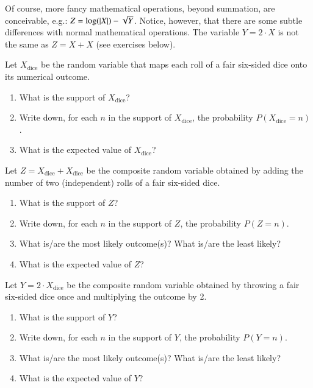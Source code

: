 \documentclass[nobib,nofonts]{tufte-handout}
\newcommand{\mult}{\ensuremath{\cdot}}
\begin{document}
Of course, more fancy mathematical operations, beyond summation, are conceivable, e.g.: $Z = \log(\lvert X \rvert) - \sqrt{Y}$.
Notice, however, that there are some subtle differences with normal mathematical operations.
The variable $Y = 2 \mult X$ is not the same as $Z = X + X$ (see exercises below).

\bigskip
\noindent \colorbox{mygray}{\centering
  \begin{minipage}{1.0\textwidth}

    \begin{exercise}
      Let $X_{\text{dice}}$ be the random variable that maps each roll of a fair six-sided dice onto its numerical outcome.
      \begin{enumerate}
        \item What is the support of $X_{\text{dice}}$?
        \item Write down, for each $n$ in the support of $X_{\text{dice}}$, the probability $P(X_{\text{dice}}=n)$.
        \item What is the expected value of $X_{\text{dice}}$?
      \end{enumerate}
    \end{exercise}

    \begin{exercise}
      Let $Z = X_{\text{dice}} + X_{\text{dice}}$ be the composite random variable obtained by adding the number of two (independent) rolls of a fair six-sided dice.
      \begin{enumerate}
        \item What is the support of $Z$?
        \item Write down, for each $n$ in the support of $Z$, the probability $P(Z=n)$.
        \item What is/are the most likely outcome(s)? What is/are the least likely?
        \item What is the expected value of $Z$?
      \end{enumerate}
    \end{exercise}

    \begin{exercise}
      Let $Y = 2 \mult X_{\text{dice}}$ be the composite random variable obtained by throwing a fair six-sided dice once and multiplying the outcome by 2.
      \begin{enumerate}
        \item What is the support of $Y$?
        \item Write down, for each $n$ in the support of $Y$, the probability $P(Y=n)$.
        \item What is/are the most likely outcome(s)? What is/are the least likely?
        \item What is the expected value of $Y$?
      \end{enumerate}
    \end{exercise}

  \end{minipage}
}


\end{document}
